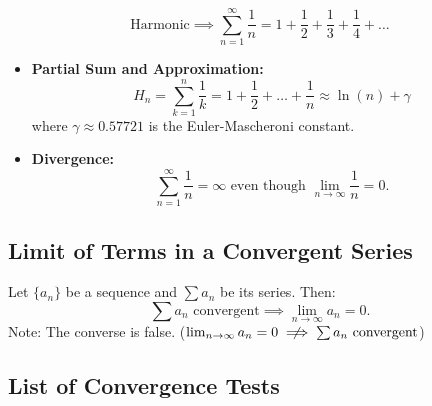 \documentclass[a4paper,11pt]{article}
\begin{document}
\begin{tcolorbox}
    \[
    \text{Harmonic} \implies \sum_{n=1}^{\infty} \frac{1}{n} = 1 + \frac{1}{2} + \frac{1}{3} + \frac{1}{4} + \dots
    \]
    \begin{itemize}
        \item \textbf{Partial Sum and Approximation:}
        \[ H_n = \sum_{k=1}^{n} \frac{1}{k} = 1 + \frac{1}{2} + \dots + \frac{1}{n} \approx \ln(n) + \gamma \]
        where $\gamma \approx 0.57721$ is the Euler-Mascheroni constant.
        \item \textbf{Divergence:}
        \[ \sum_{n=1}^{\infty} \frac{1}{n} = \infty \text{ even though } \lim_{n\to\infty} \frac{1}{n} = 0. \]
    \end{itemize}
\end{tcolorbox}




\subsection{Limit of Terms in a Convergent Series}

\begin{tcolorbox}
    Let $\{a_n\}$ be a sequence and $\textstyle \sum a_n$ be its series. Then:
    \[
    \sum a_n \text{ convergent} \implies \lim_{n \to \infty} a_n = 0.
    \]
    Note: The converse is false. ($\textstyle \lim_{n \to \infty} a_n = 0 \centernot\implies \sum a_n \text{ convergent}$)
\end{tcolorbox}




\subsection{List of Convergence Tests}
\end{document}
